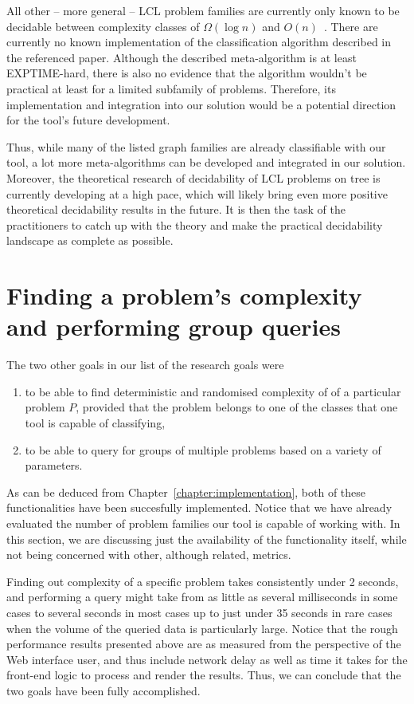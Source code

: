 All other -- more general -- LCL problem families
are currently only known to be decidable between complexity classes of
$\Omega(\log n)$ and $O(n)$~\cite{Chang2020a}. There are currently
no known implementation of the classification algorithm described in the
referenced paper. Although the described meta-algorithm is at least
EXPTIME-hard, there is also no evidence that the algorithm wouldn't be
practical at least for a limited subfamily of problems. Therefore, its
implementation and integration into our solution would be a potential
direction for the tool's future development.

Thus, while many of the listed graph families are already classifiable
with our tool, a lot more meta-algorithms can be developed
and integrated in our solution. Moreover, the theoretical
research of decidability of LCL problems on tree is currently
developing at a high pace, which will likely bring even more
positive theoretical decidability results in the future.
It is then the task of the practitioners to catch up with
the theory and make the practical decidability landscape
as complete as possible.

\section{Finding a problem's complexity and performing group queries}

The two other goals in our list of the research goals were

\begin{enumerate}
  \item to be able to find deterministic and randomised complexity of
  of a particular problem $P$, provided that the problem belongs to
  one of the classes that one tool is capable of classifying,
  \item to be able to query for groups of multiple problems based
  on a variety of parameters.
\end{enumerate}

As can be deduced from Chapter~\ref{chapter:implementation},
both of these functionalities have been succesfully implemented.
Notice that
we have already evaluated the number of
problem families our tool is capable of working with. In this section,
we are discussing just the availability of the functionality itself, while not
being concerned with other, although related, metrics.

Finding out complexity of a specific problem takes consistently under
2 seconds, and performing a query might take from as little as several milliseconds
in some cases to several seconds in most cases
up to just under 35 seconds in rare cases when the volume of the queried data is particularly large.
Notice that the rough performance results presented above are as measured
from the perspective of the Web interface user, and thus include
network delay as well as time it takes for the front-end logic to process
and render the results.
Thus, we can conclude that the two goals have been fully accomplished.

